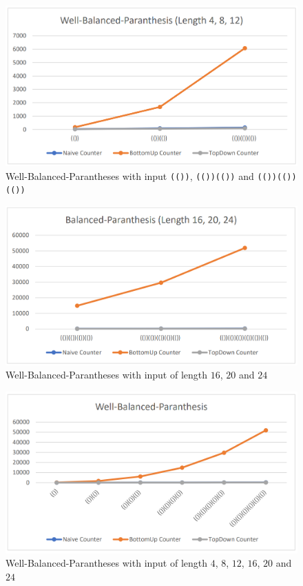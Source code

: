 \documentclass[a4paper, 11pt]{article}
\begin{document}
\begin{figure}[H]
\includegraphics[scale=0.5]{diagrams/BP_1.png}
\caption{Well-Balanced-Parantheses with input \texttt{(())}, \texttt{(())(())} and \texttt{(())(())(())}}
\end{figure}

\begin{figure}[H]
\includegraphics[scale=0.5]{diagrams/BP_2.png}
\caption{Well-Balanced-Parantheses with input of length $16$, $20$ and $24$}
\end{figure}

\begin{figure}[H]
\includegraphics[scale=0.5]{diagrams/BP_C.png}
\caption{Well-Balanced-Parantheses with input of length $4$, $8$, $12$, $16$, $20$ and $24$}
\end{figure}
\end{document}
